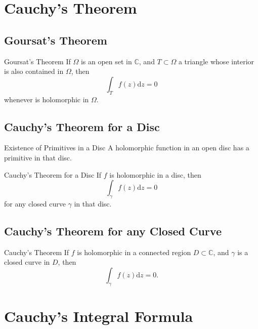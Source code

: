 
\section{Cauchy's Theorem}

\subsection{Goursat's Theorem}

\begin{theorem}{Goursat's Theorem}{}
  If $\Omega$ is an open set in $\mathbb{C}$,
  and $T \subset \Omega$ a triangle whose interior is also contained in $\Omega$,
  then
  \begin{equation}
    \int_T f(z)\mathrm{d} z = 0
  \end{equation}
  whenever is holomorphic in $\Omega$.
\end{theorem}

\subsection{Cauchy's Theorem for a Disc}

\begin{theorem}{Existence of Primitives in a Disc}{}
  A holomorphic function in an open disc has a primitive in that disc.
\end{theorem}

\begin{theorem}{Cauchy's Theorem for a Disc}{}
  If $f$ is holomorphic in a disc, then
  \begin{equation}
    \int_{\gamma} f(z)\mathrm{d} z = 0
  \end{equation}
  for any closed curve $\gamma$ in that disc.
\end{theorem}

\subsection{Cauchy's Theorem for any Closed Curve}

\begin{theorem}{Cauchy's Theorem}{}
  If $f$ is holomorphic in a connected region $D \subset \mathbb{C}$,
  and $\gamma$ is a closed curve in $D$, then
  \begin{equation}
    \int_{\gamma} f(z)\mathrm{d} z = 0.
  \end{equation}
\end{theorem}

\section{Cauchy's Integral Formula}

